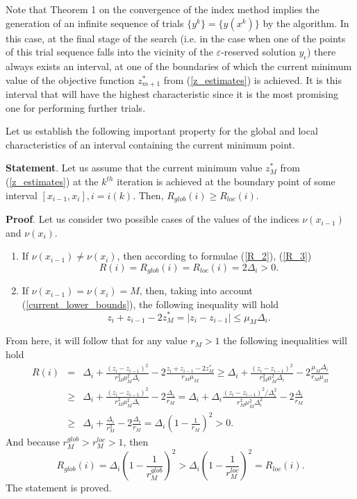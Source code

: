 \documentclass[preprint]{elsarticle}
\begin{document}
	Note that Theorem 1 on the convergence of the index method implies the generation of an infinite sequence of trials $\{y^k\}=\big\{y(x^k )\big\}$ by the algorithm. In this case, at the final stage of the search (i.e. in the case when one of the points of this trial sequence falls into the vicinity of the $\varepsilon$-reserved solution $y_\epsilon$) there always exists an interval, at one of the boundaries of which the current minimum value of the objective function $z_{m+1}^\ast$  from (\ref{z_estimates}) is achieved. It is this interval that will have the highest characteristic since it is the most promising one for performing further trials. 

	Let us establish the following important property for the global and local characteristics of an interval containing the current minimum point.

	\textbf{Statement}. Let us assume that the current minimum value $z_M^\ast$  from (\ref{z_estimates}) at the $k^{th}$ iteration is achieved at the boundary point of some interval $[x_{i-1}, x_i], i=i(k)$. Then, $R_{glob}(i) \geq R_{loc}(i)$.

	\textbf{Proof}. Let us consider two possible cases of the values of the indices $\nu(x_{i-1})$ and $\nu(x_i)$. 
\begin{enumerate} 
  \item If $\nu(x_{i-1}) \neq \nu(x_i)$, then according to  formulae (\ref{R_2}), (\ref{R_3}) 
\begin{equation}\label{R_glob_1}
	R(i)=R_{glob}(i)=R_{loc}(i)=2\Delta_i>0. 
\end{equation}
  \item If $\nu(x_{i-1}) = \nu(x_i) = M$, then, taking into account (\ref{current_lower_bounds}), the following inequality will hold
$$
	z_i+z_{i-1}-2z_M^* = |z_i-z_{i-1}|\leq \mu_M\Delta_i .
$$
\end{enumerate}
From here, it will follow that for any value $r_M>1$ the following inequalities will hold
\begin{eqnarray}
	R(i) & = & \Delta_i + \frac{(z_i-z_{i-1})^2}{r_M^2\mu_M^2\Delta_i} - 2\frac{z_i+z_{i-1}-2z_M^*}{r_M\mu_M} \geq \Delta_i + \frac{(z_i-z_{i-1})^2}{r_M^2\mu_M^2\Delta_i} - 2\frac{\mu_M\Delta_i}{r_M\mu_M} \nonumber \\
	& \geq & \Delta_i + \frac{(z_i-z_{i-1})^2}{r_M^2\mu_M^2\Delta_i} - 2\frac{\Delta_i}{r_M} = \Delta_i + \Delta_i\frac{(z_i-z_{i-1})^2/\Delta_i^2}{r_M^2\mu_M^2\Delta_i^2} - 2\frac{\Delta_i}{r_M}
\nonumber \\
	& \geq & \Delta_i + \frac{\Delta_i}{r_M^2} - 2\frac{\Delta_i}{r_M} = \Delta_i \left( 1-\frac{1}{r_M} \right)^2>0.
	\nonumber
\end{eqnarray}
And because $r_{M}^{glob} > r_{M}^{loc} > 1$, then
\begin{equation}\label{R_glob_greater_R_loc}
	R_{glob}(i)=\Delta_i\left(1-\frac{1}{r_M^{glob}} \right)^2 > \Delta_i\left(1-\frac{1}{r_M^{loc}} \right)^2 = R_{loc}(i).
\end{equation}
The statement is proved.
\end{document}

